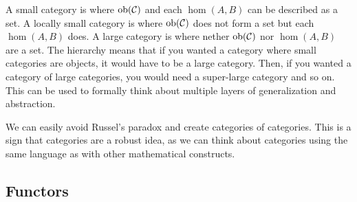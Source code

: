 \documentclass[10pt,a4paper,reqno]{amsart}
\numberwithin{figure}{section}
\begin{document}
A small category is where $\operatorname{ob}(\mathcal{C})$ and each $\hom(A,B)$ can be
described as a set. A locally small category is where $\operatorname{ob}(\mathcal{C})$
does not form a set but each $\hom(A,B)$ does. A large category is where nether
$\operatorname{ob}(\mathcal{C})$ nor $\hom(A,B)$ are a set. The hierarchy means that if you
wanted a category where small categories are objects, it would have to be a
large category. Then, if you wanted a category of large categories, you would
need a super-large category and so on. This can be used to formally think about
multiple layers of generalization and abstraction.

We can easily avoid Russel's paradox and create categories of categories. 
This is a sign that categories are a robust idea, as we can think about 
categories using the same language as with other mathematical constructs.
\subsection{Functors}
\end{document}
